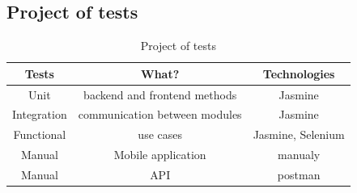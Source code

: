 \documentclass{sprawozdanie-agh}
\begin{document}
		\subsection{Project of tests}
		
		\begin{table}[h]
			\centering
			\begin{tabular}{|c|c|c|}
				\hline
				\textbf{Tests} & \textbf{What?} & \textbf{Technologies} \\
				\hline
				Unit & backend and frontend methods & Jasmine \\ \hline
				Integration & communication between modules & Jasmine \\ \hline
				Functional & use cases & Jasmine, Selenium \\ \hline
				Manual & Mobile application & manualy \\ \hline
				Manual & API & postman \\ \hline
			\end{tabular}
			\caption{Project of tests}
		\end{table}
\end{document}
